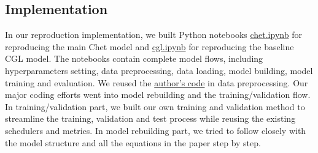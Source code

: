 \documentclass[11pt,a4paper,fleqn]{article}
\begin{document}
\subsection{Implementation}
In our reproduction implementation, we built Python notebooks
\href{https://github.com/willtsai/dlh-sp23-team53/blob/main/chet.ipynb}{chet.ipynb} 
for reproducing the main Chet model and 
\href{https://github.com/willtsai/dlh-sp23-team53/blob/main/cgl.ipynb}{cgl.ipynb}
for reproducing the baseline CGL model. The notebooks contain complete model
flows, including hyperparameters setting, data preprocessing, data loading,
model building, model training and evaluation. We reused the
\href{https://github.com/LuChang-CS/Chet}{author's code} in data preprocessing.
Our major coding efforts went into model rebuilding and the training/validation
flow. In training/validation part, we built our own training and validation
method to streamline the training, validation and test process while reusing the
existing schedulers and metrics. In model rebuilding part, we tried to follow
closely with the model structure and all the equations in the paper step by
step.
\end{document}
